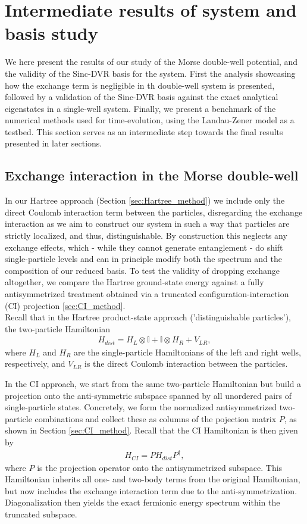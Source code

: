 \documentclass{subfiles}
\begin{document}
\section{Intermediate results of system and basis study}\label{sec:general_study_results}
We here present the results of our study of the Morse double-well potential, and the validity of the Sinc-DVR basis for the system. First the analysis showcasing how the exchange term is negligible in th double-well system is presented, followed by a validation of the Sinc-DVR basis against the exact analytical eigenstates in a single-well system. Finally, we present a benchmark of the numerical methods used for time-evolution, using the Landau-Zener model as a testbed. This section serves as an intermediate step towards the final results presented in later sections.

\subsection{Exchange interaction in the Morse double-well}
In our Hartree approach (Section \ref{sec:Hartree_method}) we include only the direct Coulomb interaction term between the particles, disregarding the exchange interaction as we aim to construct our system in such a way that particles are strictly localized, and thus, distinguishable. By construction this neglects any exchange effects, which - while they cannot generate entanglement - do shift single-particle levels and can in principle modify both the spectrum and the composition of our reduced basis. To test the validity of dropping exchange altogether, we compare the Hartree ground-state energy against a fully antisymmetrized treatment obtained via a truncated configuration-interaction (CI) projection \ref{sec:CI_method}. \\ 

Recall that in the Hartree product-state approach ('distinguishable particles'), the two-particle Hamiltonian
\begin{align*}
    H_{dist} = H_L \otimes \mathbb{I} + \mathbb{I} \otimes H_R + V_{LR},
\end{align*}
where $H_L$ and $H_R$ are the single-particle Hamiltonians of the left and right wells, respectively, and $V_{LR}$ is the direct Coulomb interaction between the particles. 

In the CI approach, we start from the same two-particle Hamiltonian but build a projection onto the anti-symmetric subspace spanned by all unordered pairs of single-particle states. Concretely, we form the normalized antisymmetrized two-particle combinations and  collect these as columns of the pojection matrix $P$, as shown in Section \ref{sec:CI_method}. Recall that the CI Hamiltonian is then given by
\begin{align*}
    H_{CI} = P H_{dist} P^\dagger,
\end{align*}
where $P$ is the projection operator onto the antisymmetrized subspace. This Hamiltonian inherits all one- and two-body terms from the original Hamiltonian, but now includes the exchange interaction term due to the anti-symmetrization. Diagonalization then yields the exact fermionic energy spectrum within the truncated subspace.
\end{document}
